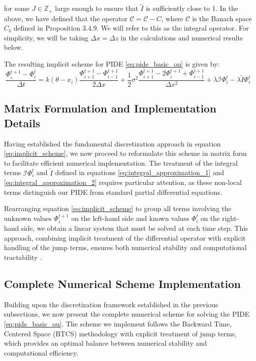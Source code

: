 \documentclass[11pt,twoside,openright]{report}
\begin{document}
for some $J \in \mathbb{Z}_+$ large enough to ensure that $\tilde{I}$ is sufficiently close to 1. In the above, we have defined that the operator $\mathcal{C} = \mathcal{C} - C$, where $\mathcal{C}$ is the Banach space $C_b$ defined in Proposition 3.4.9. We will refer to this as the integral operator. For simplicity, we will be taking $\Delta x = \Delta z$ in the calculations and numerical results below.

The resulting implicit scheme for PIDE \eqref{eq:pide_basic_ou} is given by:
\begin{equation}
\frac{\Phi^{t+1}_i - \Phi^t_i}{\Delta t} = k(\theta - x_i)\frac{\Phi^{t+1}_{i+1} - \Phi^{t+1}_{i-1}}{2\Delta x} + \frac{1}{2}\sigma^2 \frac{\Phi^{t+1}_{i+1} - 2\Phi^{t+1}_i + \Phi^{t+1}_{i-1}}{\Delta x^2} + \lambda\mathcal{I}\Phi^t_i - \lambda\tilde{I}\Phi^t_i
\label{eq:implicit_scheme}
\end{equation}

\subsection{Matrix Formulation and Implementation Details}

Having established the fundamental discretization approach in equation \eqref{eq:implicit_scheme}, we now proceed to reformulate this scheme in matrix form to facilitate efficient numerical implementation. The treatment of the integral terms $\mathcal{I}\Phi^t_i$ and $\tilde{I}$ defined in equations \eqref{eq:integral_approximation_1} and \eqref{eq:integral_approximation_2} requires particular attention, as these non-local terms distinguish our PIDE from standard partial differential equations.

Rearranging equation \eqref{eq:implicit_scheme} to group all terms involving the unknown values $\Phi^{t+1}_i$ on the left-hand side and known values $\Phi^t_i$ on the right-hand side, we obtain a linear system that must be solved at each time step. This approach, combining implicit treatment of the differential operator with explicit handling of the jump terms, ensures both numerical stability and computational tractability \cite{georgiou2023thesis}.

\subsection{Complete Numerical Scheme Implementation}

Building upon the discretization framework established in the previous subsections, we now present the complete numerical scheme for solving the PIDE \eqref{eq:pide_basic_ou}. The scheme we implement follows the Backward Time, Centered Space (BTCS) methodology with explicit treatment of jump terms, which provides an optimal balance between numerical stability and computational efficiency.
\end{document}

